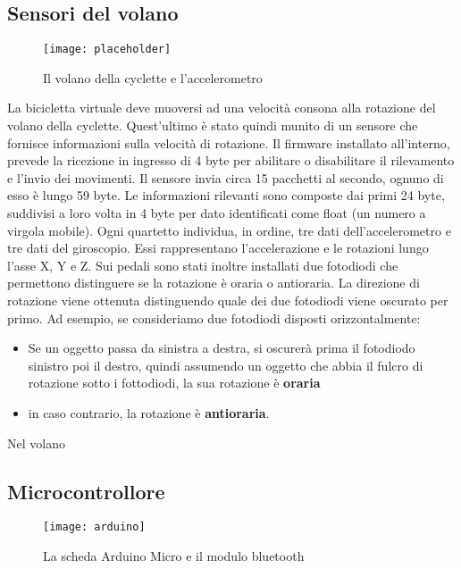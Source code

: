 \subsection{Sensori del volano}
\begin{wrapfigure}{l}{0.4\textwidth} %
    \centering
    \vspace{-0.3cm}
    \texttt{[image: placeholder]}
    \caption{Il volano della cyclette e l'accelerometro}
    \vspace{-1cm}
\end{wrapfigure}
La bicicletta virtuale deve muoversi ad una velocità consona alla rotazione del volano della cyclette. Quest'ultimo è stato quindi munito di un sensore che fornisce informazioni sulla velocità di rotazione. Il firmware installato all’interno, prevede la ricezione in ingresso di 4 byte per abilitare o disabilitare il rilevamento e l’invio dei movimenti. Il sensore invia circa 15 pacchetti al secondo, ognuno di esso è lungo 59 byte. Le informazioni rilevanti sono composte dai primi 24 byte, suddivisi a loro volta in 4 byte per dato identificati come float (un numero a virgola mobile). Ogni quartetto individua, in ordine, tre dati dell’accelerometro e tre dati del giroscopio. Essi rappresentano l’accelerazione e le rotazioni lungo l’asse X, Y e Z. Sui pedali sono stati inoltre installati due fotodiodi che permettono distinguere se la rotazione è oraria o antioraria. La direzione di rotazione viene ottenuta distinguendo quale dei due fotodiodi viene oscurato per primo. Ad esempio, se consideriamo due fotodiodi disposti orizzontalmente:\\
\begin{itemize}
  \item Se un oggetto passa da sinistra a destra, si oscurerà prima il fotodiodo sinistro poi il destro, quindi assumendo un oggetto che abbia il fulcro di rotazione sotto i fottodiodi, la sua rotazione è \textbf{oraria}
  \item in caso contrario, la rotazione è \textbf{antioraria}.
\end{itemize}
Nel volano 

\subsection{Microcontrollore}
\begin{wrapfigure}{r}{0.4\textwidth} %
    \centering
    \vspace{-1.3cm}
    \texttt{[image: arduino]}
    \caption{La scheda Arduino Micro e il modulo bluetooth}
    \vspace{-1.3cm}
\end{wrapfigure}


